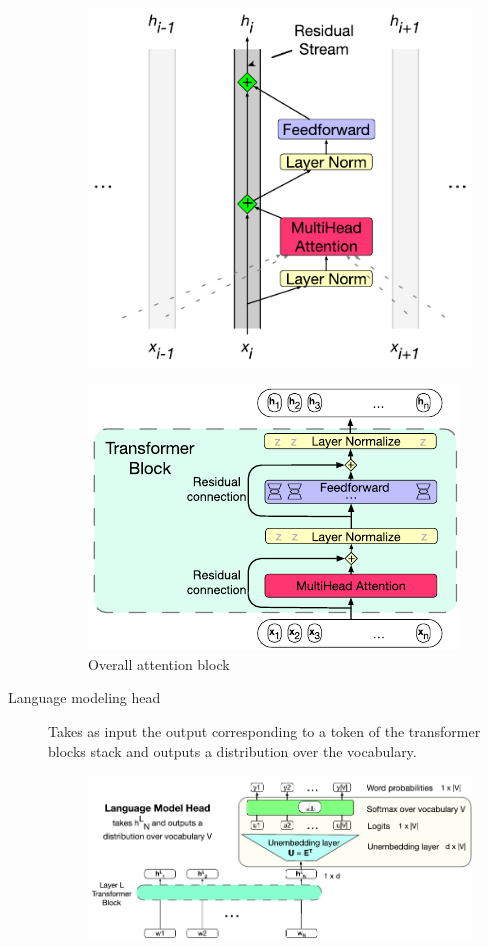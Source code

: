 \begin{description}
\begin{descriptionlist}
\begin{remark}
                    \begin{figure}[H]
                        \centering
                        \includegraphics[width=0.38\linewidth]{./img/_residual_stream.pdf}
                    \end{figure}
                \end{remark}
        \end{descriptionlist}

        \begin{figure}[H]
            \centering
            \includegraphics[width=0.4\linewidth]{./img/_attention_block.pdf}
            \caption{Overall attention block}
        \end{figure}

    \item[Language modeling head] 
        Takes as input the output corresponding to a token of the transformer blocks stack and outputs a distribution over the vocabulary.

        \begin{figure}[H]
            \centering
            \includegraphics[width=0.6\linewidth]{./img/_lm_head.pdf}
        \end{figure}
\end{description}